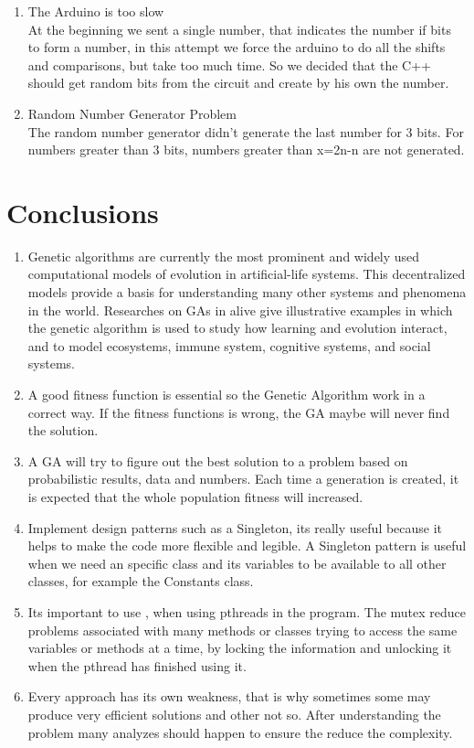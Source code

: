 \documentclass[twocolumn]{IEEEtran}
\begin{document}
\begin{enumerate}
	\item The Arduino is too slow\\
    At the beginning we sent a single number, that indicates the number if bits to form a number, in 
    this attempt we force the arduino to do all the shifts and comparisons, but take too much time. So we decided that the C++ should get random bits from the circuit and create by his own the number.
    
    \item Random Number Generator Problem\\
    The random number generator didn't generate the last number for 3 bits. For numbers greater than 3 bits, numbers greater than x=2n-n are not generated. 
	
\end{enumerate}


\section{Conclusions}
\begin{enumerate}
    \item Genetic algorithms are currently the most prominent and widely used computational models of evolution in artificial-life systems. This decentralized models provide a basis for understanding many other systems and phenomena in the world. Researches on GAs in alive give illustrative examples in which the genetic algorithm is used to study how learning and evolution interact, and to model ecosystems, immune system, cognitive systems, and social systems.
    \item A good fitness function is essential so the Genetic Algorithm work in a correct way. If the fitness functions is wrong, the GA maybe will never find the solution.
    \item A GA will try to figure out the best solution to a problem based on probabilistic results, data and numbers. Each time a generation is created, it is expected that the whole population fitness will increased.
    \item Implement design patterns such as a Singleton, its really useful because it helps to make the code more flexible and legible. A Singleton pattern is useful when we need an specific class and its variables to be available to all other classes, for example the Constants class.
    \item Its important to use , when using pthreads in the program. The mutex reduce problems associated with many methods or classes trying to access the same variables or methods at a time, by locking the information and unlocking it when the pthread has finished using it.
    \item Every approach has its own weakness, that is why sometimes some may produce very efficient solutions and other not so. After understanding the problem many analyzes should happen to ensure the reduce the complexity.\cite{22}   
\end{enumerate}
\end{document}
